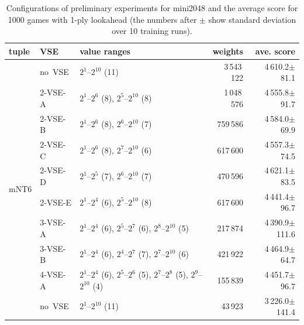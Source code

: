 \begin{table}
\caption{Configurations of preliminary experiments for mini2048 and the average score for 1000 games with 1-ply lookahead (the numbers after $\pm$ show standard deviation over 10 training runs).}
\label{table:pre-results}
 \setlength{\doublerulesep}{.4pt}
 \small\begin{tabular}{l|l|p{170pt}|r|r}
  \hline\hline
   tuple			& VSE			& value ranges									& weights	& ave. score \\
  \hline
   \multirow{11}{*}{mNT6}	& \mbox{no VSE}		& \phantom{\rule{1pt}{9.5pt}}$2^1$--$2^{10}$ (11)								& 3\,543\,122	& 4\,610.2$\pm$\phantom{0}81.1 \\ \cline{2-5}
				& \mbox{2-VSE-A}	& \phantom{\rule{1pt}{9.5pt}}$2^1$--$2^6$ (8), $2^{5}$--$2^{10}$ (8)					& 1\,048\,576	& 4\,555.8$\pm$\phantom{0}91.7\\ \cline{2-5}
				& \mbox{2-VSE-B}	& \phantom{\rule{1pt}{9.5pt}}$2^1$--$2^6$ (8), $2^{6}$--$2^{10}$ (7)					& 759\,586	& 4\,584.0$\pm$\phantom{0}69.9\\ \cline{2-5}
				& \mbox{2-VSE-C}	& \phantom{\rule{1pt}{9.5pt}}$2^1$--$2^6$ (8), $2^{7}$--$2^{10}$ (6)					& 617\,600	& 4\,557.3$\pm$\phantom{0}74.5\\ \cline{2-5}
				& \mbox{2-VSE-D}	& \phantom{\rule{1pt}{9.5pt}}$2^1$--$2^5$ (7), $2^{6}$--$2^{10}$ (7)					& 470\,596	& 4\,621.1$\pm$\phantom{0}83.5\\ \cline{2-5}
				& \mbox{2-VSE-E}	& \phantom{\rule{1pt}{9.5pt}}$2^1$--$2^4$ (6), $2^{5}$--$2^{10}$ (8)					& 617\,600	& 4\,441.4$\pm$\phantom{0}96.7\\ \cline{2-5}
				& \mbox{3-VSE-A}	& \phantom{\rule{1pt}{9.5pt}}$2^1$--$2^4$ (6), $2^{5}$--$2^{7}$ (6), $2^8$--$2^{10}$ (5)			& 217\,874	& 4\,390.9$\pm$111.6\\ \cline{2-5}
				& \mbox{3-VSE-B}	& \phantom{\rule{1pt}{9.5pt}}$2^1$--$2^4$ (6), $2^{4}$--$2^{7}$ (7), $2^7$--$2^{10}$ (6)			& 421\,922	& 4\,464.9$\pm$\phantom{0}64.7\\ \cline{2-5}
				& \mbox{4-VSE-A}	& \phantom{\rule{1pt}{9.5pt}}$2^1$--$2^4$ (6), $2^5$--$2^6$ (5), $2^7$--$2^8$ (5), $2^9$--$2^{10}$ (4)	& 155\,839	& 4\,451.7$\pm$\phantom{0}96.7\\ \hline
   mNT4				& \mbox{no VSE}		& \phantom{\rule{1pt}{9.5pt}}$2^1$--$2^{10}$ (11)								& 43\,923	& 3\,226.0$\pm$141.4\\\hline
 \end{tabular}
\end{table}

